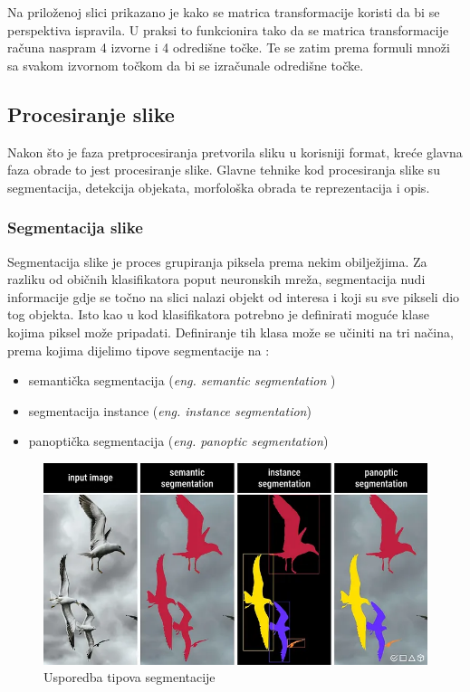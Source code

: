 \documentclass{foi}
\begin{document}
Na priloženoj slici prikazano je kako se matrica transformacije koristi da bi se perspektiva ispravila. U praksi to funkcionira tako da se matrica transformacije računa naspram 4 izvorne i 4 odredišne točke. Te se zatim prema formuli množi sa svakom izvornom točkom da bi se izračunale odredišne točke.

\subsection{Procesiranje slike}

Nakon što je faza pretprocesiranja pretvorila sliku u korisniji format, kreće glavna faza obrade to jest procesiranje slike. Glavne tehnike kod procesiranja slike su segmentacija, detekcija objekata, morfološka obrada te reprezentacija i opis.

\subsubsection{Segmentacija slike}

Segmentacija slike je proces grupiranja piksela prema nekim obilježjima. Za razliku od običnih klasifikatora poput neuronskih mreža, segmentacija nudi informacije gdje se točno na slici nalazi objekt od interesa i koji su sve pikseli dio tog objekta. Isto kao u kod klasifikatora potrebno je definirati moguće klase kojima piksel može pripadati. Definiranje tih klasa može se učiniti na tri načina, prema kojima dijelimo tipove segmentacije na \cite{segmentacija}:

\begin{itemize}
    \item semantička segmentacija (\textit{eng. semantic segmentation })
    \item segmentacija instance (\textit{eng. instance segmentation})
    \item panoptička segmentacija (\textit{eng. panoptic segmentation})
\end{itemize}

\begin{figure}[H]
    \centering
    \includegraphics[width=0.85\linewidth]{slike/sesgmentacija.png}
    \caption{Usporedba tipova segmentacije \cite{segmentacija}}
\end{figure}
\end{document}
